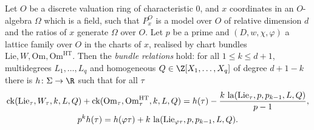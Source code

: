 \begin{theorem}\label{pf:towergeo:ckrel}
Let $O$ be a discrete valuation ring of characteristic $0$, and $x$ coordinates in an $O$-algebra $\Omega$ which
is a field, such that $P^O_x$ is a model over $O$ of relative dimension $d$ and the ratios of $x$ generate $\Omega$
over $O$. Let $p$ be a prime and $(D,w,\chi,\varphi)$ a lattice family over $O$ in the charts of $x$, realised by
chart bundles $\mathrm{Lie},W,\mathrm{Om},\mathrm{Om}^{\mathrm{HT}}$. Then the \emph{bundle relations} hold: for
all $1\le k\le d+1$, multidegrees $L_1,\dots,L_q$ and homogeneous $Q\in\Z[X_1,\dots,X_q]$ of degree $d+1-k$
there is $h\colon\Sigma\to\R$ such that for all $\tau$
\begin{gather*}
\operatorname{ck}(\mathrm{Lie}_\tau,W_\tau,k,L,Q)+\operatorname{ck}(\mathrm{Om}_\tau,\mathrm{Om}^{\mathrm{HT}}_\tau,k,L,Q)
=h(\tau)-\frac{k\,\operatorname{la}(\mathrm{Lie}_\tau,p,p_{k-1},L,Q)}{p-1},\\
p^kh(\tau)=h(\varphi\tau)+k\,\operatorname{la}(\mathrm{Lie}_{\varphi\tau},p,p_{k-1},L,Q).
\end{gather*}
\end{theorem}

